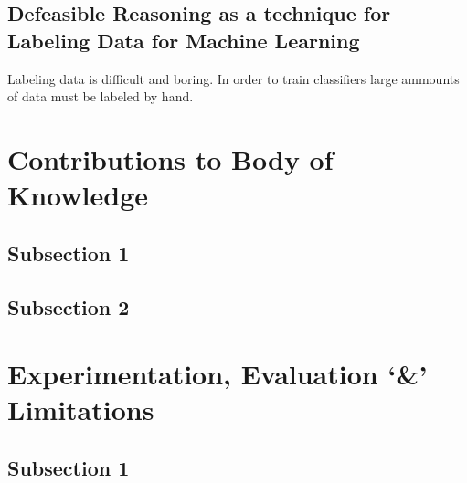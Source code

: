 
\subsection{Defeasible Reasoning as a technique for Labeling Data for Machine Learning}

Labeling data is difficult and boring. In order to train classifiers large ammounts of data must be labeled by hand.







\section{Contributions to Body of Knowledge}



\subsection{Subsection 1}




\subsection{Subsection 2}





\section{Experimentation, Evaluation `\&' Limitations}


\subsection{Subsection 1}

